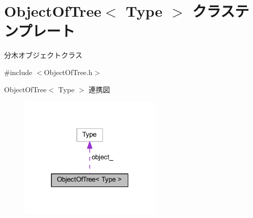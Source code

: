 \hypertarget{class_object_of_tree}{}\section{Object\+Of\+Tree$<$ Type $>$ クラステンプレート}
\label{class_object_of_tree}


分木オブジェクトクラス  




{\ttfamily \#include $<$Object\+Of\+Tree.\+h$>$}



Object\+Of\+Tree$<$ Type $>$ 連携図\nopagebreak
\begin{figure}[H]
\begin{center}
\leavevmode
\includegraphics[width=193pt]{class_object_of_tree__coll__graph}
\end{center}
\end{figure}
